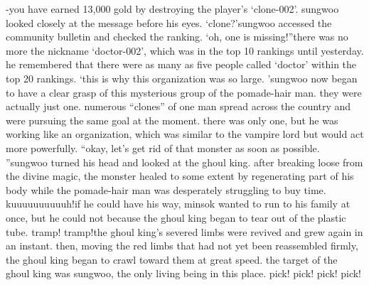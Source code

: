 -you have earned 13,000 gold by destroying the player’s ‘clone-002’.
sungwoo looked closely at the message before his eyes.
‘clone?’sungwoo accessed the community bulletin and checked the ranking.
‘oh, one is missing!”there was no more the nickname ‘doctor-002’, which was in the top 10 rankings until yesterday.
 he remembered that there were as many as five people called ‘doctor’ within the top 20 rankings.
‘this is why this organization was so large.
’sungwoo now began to have a clear grasp of this mysterious group of the pomade-hair man.
 they were actually just one.
 numerous “clones” of one man spread across the country and were pursuing the same goal at the moment.
there was only one, but he was working like an organization, which was similar to the vampire lord but would act more powerfully.
“okay, let’s get rid of that monster as soon as possible.
”sungwoo turned his head and looked at the ghoul king.
 after breaking loose from the divine magic, the monster healed to some extent by regenerating part of his body while the pomade-hair man was desperately struggling to buy time.
kuuuuuuuuuuh!if he could have his way, minsok wanted to run to his family at once, but he could not because the ghoul king began to tear out of the plastic tube.
tramp! tramp!the ghoul king’s severed limbs were revived and grew again in an instant.
 then, moving the red limbs that had not yet been reassembled firmly, the ghoul king began to crawl toward them at great speed.
the target of the ghoul king was sungwoo, the only living being in this place.
pick! pick! pick! pick!

 